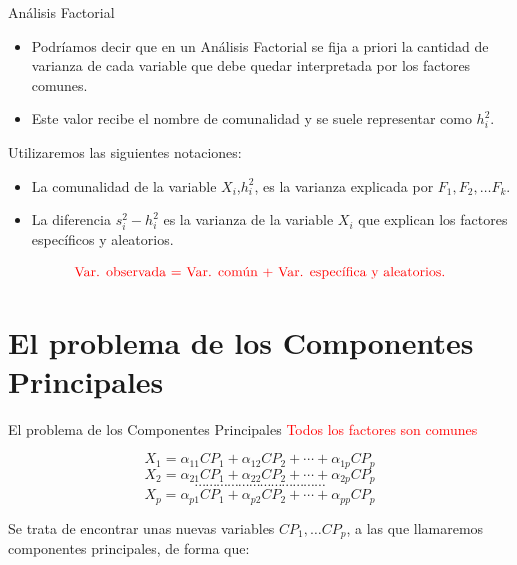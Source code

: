 \documentclass[
  ignorenonframetext,
]{beamer}
\providecommand{\tightlist}{%
  \setlength{\itemsep}{0pt}\setlength{\parskip}{0pt}}
\newcommand\red[1]{\textcolor{red}{#1}}
\begin{document}
\begin{frame}{Análisis Factorial}
\protect\hypertarget{anuxe1lisis-factorial-1}{}
\begin{itemize}
\tightlist
\item
  Podríamos decir que en un Análisis Factorial se fija a priori la
  cantidad de varianza de cada variable que debe quedar interpretada por
  los factores comunes.
\item
  Este valor recibe el nombre de comunalidad y se suele representar como
  \(h_i^2\).
\end{itemize}

Utilizaremos las siguientes notaciones:

\begin{itemize}
\tightlist
\item
  La comunalidad de la variable \(X_i\),\(h_i^2\), es la varianza
  explicada por \(F_1,F_2,\ldots F_k.\)
\item
  La diferencia \(s_i^2-h_i^2\) es la varianza de la variable \(X_i\)
  que explican los factores específicos y aleatorios.
\end{itemize}

\[\color{red}{\mbox{Var. observada = Var. común + Var. específica y aleatorios}}.\]
\end{frame}

\hypertarget{el-problema-de-los-componentes-principales}{%
\section{El problema de los Componentes
Principales}\label{el-problema-de-los-componentes-principales}}

\begin{frame}{El problema de los Componentes Principales}
\protect\hypertarget{el-problema-de-los-componentes-principales-1}{}
\red{Todos los factores son comunes}

\[X_1=\alpha_{1 1} CP_1+ \alpha_{1 2} CP_2+\cdots +\alpha_{1 p} CP_p\]
\[X_2=\alpha_{2 1} CP_1+ \alpha_{2 2} CP_2+\cdots +\alpha_{2 p} CP_p\]
\[\cdots\cdots\cdots\cdots\cdots\cdots\cdots\cdots\cdots\cdots\cdots\cdots\]
\[X_p=\alpha_{p 1} CP_1+ \alpha_{p 2} CP_2+\cdots +\alpha_{p p} CP_p\]

Se trata de encontrar unas nuevas variables \(CP_1,\ldots CP_p\), a las
que llamaremos componentes principales, de forma que:
\end{frame}
\end{document}
